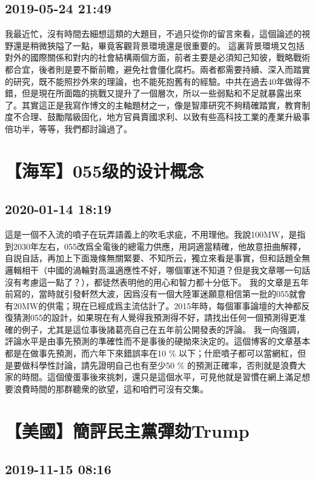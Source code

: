 \documentclass[twocolumn]{ctexart}
\begin{document}
\subsection*{2019-05-24 21:49}

我最近忙，沒有時間去細想這類的大題目，不過只從你的留言來看，這個論述的視野還是稍微狹隘了一點，畢竟客觀背景環境還是很重要的。 
這裏背景環境又包括對外的國際關係和對内的社會結構兩個方面，前者主要是必須知己知彼，戰略戰術都合宜，後者則是要不斷前瞻，避免社會僵化腐朽。兩者都需要持續、深入而踏實的研究，既不能照抄外來的理論，也不能死抱舊有的經驗。中共在過去40年做得不錯，但是現在所面臨的挑戰又提升了一個層次，所以一些弱點和不足就暴露出來了。其實這正是我寫作博文的主軸題材之一，像是智庫研究不夠精確踏實，教育制度不合理、鼓勵階級固化，地方官員賣國求利、以致有些高科技工業的產業升級事倍功半，等等，我們都討論過了。
\section*{【海军】055级的设计概念}
\subsection*{2020-01-14 18:19}

這是一個不入流的噴子在玩弄語義上的吹毛求疵，不用理他。我說100MW，是指到2030年左右，055改爲全電後的總電力供應，用詞適當精確，他故意扭曲解釋，自説自話，再加上下面幾條無關緊要、不知所云，獨立來看是事實，但和話題全無邏輯相干（中國的渦輪對高溫適應性不好，哪個軍迷不知道？但是我文章哪一句話沒有考慮這一點了？），都徒然表明他的用心和智力都十分低下。 
我的文章是五年前寫的，當時就引發軒然大波，因爲沒有一個大陸軍迷願意相信第一批的055就會有20MW的供電；現在已經成爲主流估計了。2015年時，每個軍事論壇的大神都反復猜測055的設計，如果現在有人覺得我預測得不好，請找出任何一個預測得更准確的例子，尤其是這位事後諸葛亮自己在五年前公開發表的評論。 
我一向强調，評論水平是由事先預測的準確性而不是事後的硬拗來決定的。這個博客的文章基本都是在做事先預測，而六年下來錯誤率在10 \% 以下；什麽噴子都可以當網紅，但是要做科學性討論，請先證明自己也有至少50 \% 的預測正確率，否則就是浪費大家的時間。這個傻蛋事後來挑刺，還只是這個水平，可見他就是習慣在網上滿足想要浪費時間的那群聽衆的欲望，這和咱們可沒有交集。
\section*{【美國】簡評民主黨彈劾Trump}
\subsection*{2019-11-15 08:16}
\end{document}
